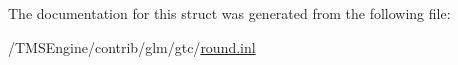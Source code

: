 The documentation for this struct was generated from the following file\+:\begin{DoxyCompactItemize}
\item 
/\+T\+M\+S\+Engine/contrib/glm/gtc/\hyperlink{round_8inl}{round.\+inl}\end{DoxyCompactItemize}
